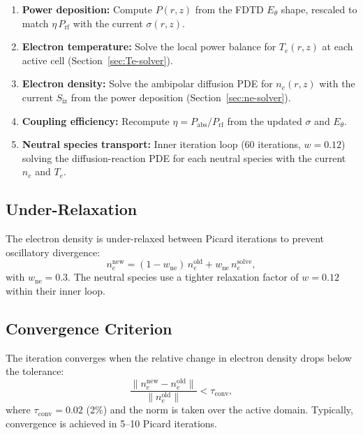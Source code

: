 \documentclass[11pt,a4paper]{report}
\newcommand{\Te}{T_e}
\begin{document}
\begin{enumerate}
  \item \textbf{Power deposition:} Compute $P(r,z)$ from the FDTD $E_\theta$ shape, rescaled to match $\eta\,P_\mathrm{rf}$ with the current $\sigma(r,z)$.
  \item \textbf{Electron temperature:} Solve the local power balance for $\Te(r,z)$ at each active cell (Section~\ref{sec:Te-solver}).
  \item \textbf{Electron density:} Solve the ambipolar diffusion PDE for $n_e(r,z)$ with the current $S_\mathrm{iz}$ from the power deposition (Section~\ref{sec:ne-solver}).
  \item \textbf{Coupling efficiency:} Recompute $\eta = P_\mathrm{abs}/P_\mathrm{rf}$ from the updated $\sigma$ and $E_\theta$.
  \item \textbf{Neutral species transport:} Inner iteration loop (60 iterations, $w = 0.12$) solving the diffusion-reaction PDE for each neutral species with the current $n_e$ and $\Te$.
\end{enumerate}

\subsection{Under-Relaxation}

The electron density is under-relaxed between Picard iterations to prevent oscillatory divergence:
\begin{equation}
  n_e^\mathrm{new} = (1 - w_\mathrm{ne})\,n_e^\mathrm{old} + w_\mathrm{ne}\,n_e^\mathrm{solve},
  \label{eq:ne-underrelax}
\end{equation}
with $w_\mathrm{ne} = 0.3$.  The neutral species use a tighter relaxation factor of $w = 0.12$ within their inner loop.

\subsection{Convergence Criterion}

The iteration converges when the relative change in electron density drops below the tolerance:
\begin{equation}
  \frac{\|n_e^\mathrm{new} - n_e^\mathrm{old}\|}{\|n_e^\mathrm{old}\|} < \tau_\mathrm{conv},
  \label{eq:picard-convergence}
\end{equation}
where $\tau_\mathrm{conv} = 0.02$ (2\%) and the norm is taken over the active domain.  Typically, convergence is achieved in 5--10 Picard iterations.
\end{document}
